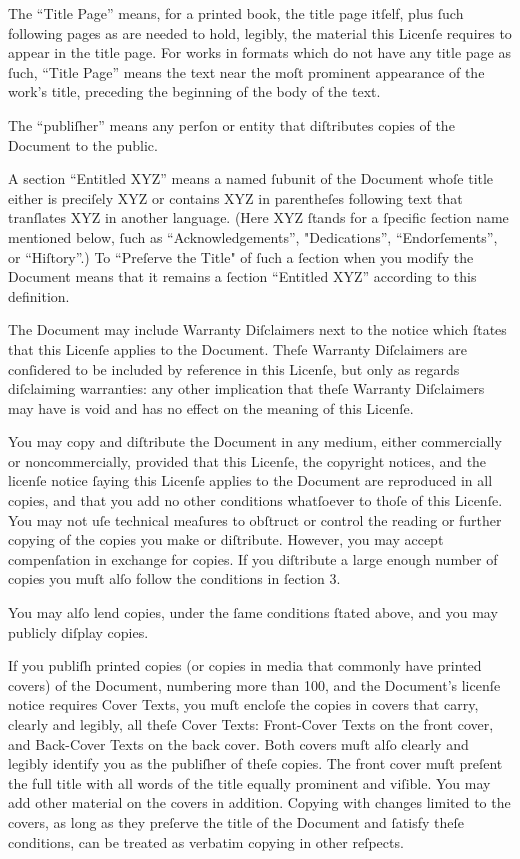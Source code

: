 The “Title Page” means, for a printed book, the title page itſelf,
plus ſuch following pages as are needed to hold, legibly, the material
this Licenſe requires to appear in the title page. For works in
formats which do not have any title page as ſuch, “Title Page” means
the text near the moſt prominent appearance of the work’s title,
preceding the beginning of the body of the text.

The “publiſher” means any perſon or entity that diſtributes copies of
the Document to the public.

A section “Entitled XYZ” means a named ſubunit of the Document whoſe
title either is preciſely XYZ or contains XYZ in parentheſes following
text that tranſlates XYZ in another language. (Here XYZ ſtands for a
ſpecific ſection name mentioned below, ſuch as “Acknowledgements”,
"Dedications”, “Endorſements”, or “Hiſtory”.)  To “Preſerve the Title"
of ſuch a ſection when you modify the Document means that it remains a
ſection “Entitled XYZ” according to this definition.

The Document may include Warranty Diſclaimers next to the notice which
ſtates that this Licenſe applies to the Document. Theſe Warranty
Diſclaimers are conſidered to be included by reference in this
Licenſe, but only as regards diſclaiming warranties: any other
implication that theſe Warranty Diſclaimers may have is void and has
no effect on the meaning of this Licenſe.


You may copy and diſtribute the Document in any medium, either
commercially or noncommercially, provided that this Licenſe, the
copyright notices, and the licenſe notice ſaying this Licenſe applies
to the Document are reproduced in all copies, and that you add no
other conditions whatſoever to thoſe of this Licenſe. You may not uſe
technical meaſures to obſtruct or control the reading or further
copying of the copies you make or diſtribute. However, you may accept
compenſation in exchange for copies. If you diſtribute a large enough
number of copies you muſt alſo follow the conditions in ſection 3.

You may alſo lend copies, under the ſame conditions ſtated above, and
you may publicly diſplay copies.


If you publiſh printed copies (or copies in media that commonly have
printed covers) of the Document, numbering more than 100, and the
Document’s licenſe notice requires Cover Texts, you muſt encloſe the
copies in covers that carry, clearly and legibly, all theſe Cover
Texts: Front-Cover Texts on the front cover, and Back-Cover Texts on
the back cover. Both covers muſt alſo clearly and legibly identify
you as the publiſher of theſe copies. The front cover muſt preſent
the full title with all words of the title equally prominent and
viſible. You may add other material on the covers in addition.
Copying with changes limited to the covers, as long as they preſerve
the title of the Document and ſatisfy theſe conditions, can be treated
as verbatim copying in other reſpects.

